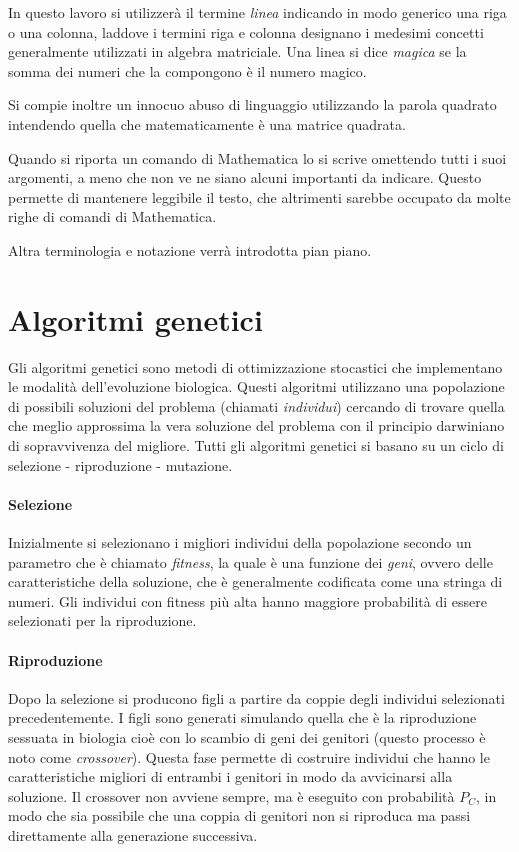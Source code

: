 \documentclass[italian,twoside,twocolumn]{article}
\begin{document}
In questo lavoro si utilizzerà il termine \emph{linea} indicando in modo generico una riga o una colonna, laddove i termini riga e colonna designano i medesimi concetti generalmente utilizzati in algebra matriciale. Una linea si dice \emph{magica} se la somma dei numeri che la compongono è il numero magico. 

Si compie inoltre un innocuo abuso di linguaggio utilizzando la parola quadrato intendendo quella che matematicamente è una matrice quadrata. 

Quando si riporta un comando di Mathematica lo si scrive omettendo tutti i suoi argomenti, a meno che non ve ne siano alcuni importanti da indicare. Questo permette di mantenere leggibile il testo, che altrimenti sarebbe occupato da molte righe di comandi di Mathematica. 

Altra terminologia e notazione verrà introdotta pian piano.

\section{Algoritmi genetici}
Gli algoritmi genetici sono metodi di ottimizzazione stocastici che implementano le modalità dell'evoluzione biologica. Questi algoritmi utilizzano una popolazione di possibili soluzioni del problema (chiamati \emph{individui}) cercando di trovare quella che meglio approssima la vera soluzione del problema con il principio darwiniano di sopravvivenza del migliore. Tutti gli algoritmi genetici si basano su un ciclo di selezione - riproduzione - mutazione.
\paragraph{Selezione} Inizialmente si selezionano i migliori individui della popolazione secondo un parametro che è chiamato \emph{fitness}, la quale è una funzione dei \emph{geni}, ovvero delle caratteristiche della soluzione, che è generalmente codificata come una stringa di numeri. Gli individui con fitness più alta hanno maggiore probabilità di essere selezionati per la riproduzione.

\paragraph{Riproduzione} Dopo la selezione si producono figli a partire da coppie degli individui selezionati precedentemente. I figli sono generati simulando quella che è la riproduzione sessuata in biologia cioè con lo scambio di geni dei genitori (questo processo è noto come \emph{crossover}). Questa fase permette di costruire individui che hanno le caratteristiche migliori di entrambi i genitori in modo da avvicinarsi alla soluzione. Il crossover non avviene sempre, ma è eseguito con probabilità $ P_C $, in modo che sia possibile che una coppia di genitori non si riproduca ma passi direttamente alla generazione successiva.  
\end{document}
